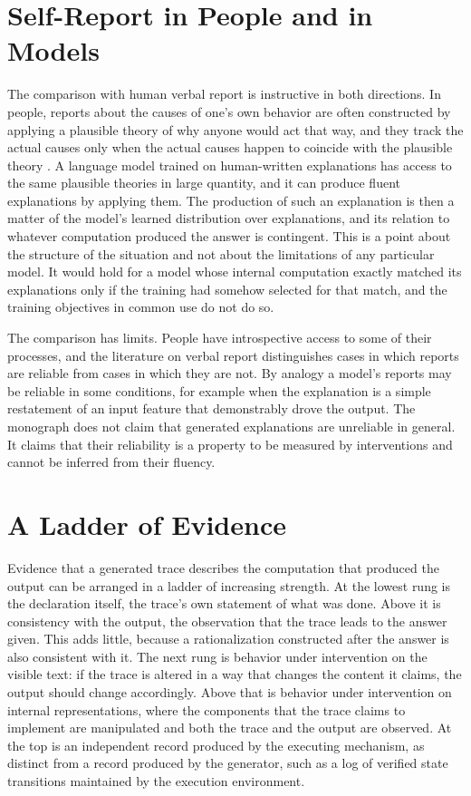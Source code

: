 \section{Self-Report in People and in Models}

The comparison with human verbal report is instructive in both directions. In people, reports about the causes of one's own behavior are often constructed by applying a plausible theory of why anyone would act that way, and they track the actual causes only when the actual causes happen to coincide with the plausible theory \cite{nisbett1977}. A language model trained on human-written explanations has access to the same plausible theories in large quantity, and it can produce fluent explanations by applying them. The production of such an explanation is then a matter of the model's learned distribution over explanations, and its relation to whatever computation produced the answer is contingent. This is a point about the structure of the situation and not about the limitations of any particular model. It would hold for a model whose internal computation exactly matched its explanations only if the training had somehow selected for that match, and the training objectives in common use do not do so.

The comparison has limits. People have introspective access to some of their processes, and the literature on verbal report distinguishes cases in which reports are reliable from cases in which they are not. By analogy a model's reports may be reliable in some conditions, for example when the explanation is a simple restatement of an input feature that demonstrably drove the output. The monograph does not claim that generated explanations are unreliable in general. It claims that their reliability is a property to be measured by interventions and cannot be inferred from their fluency.

\section{A Ladder of Evidence}

Evidence that a generated trace describes the computation that produced the output can be arranged in a ladder of increasing strength. At the lowest rung is the declaration itself, the trace's own statement of what was done. Above it is consistency with the output, the observation that the trace leads to the answer given. This adds little, because a rationalization constructed after the answer is also consistent with it. The next rung is behavior under intervention on the visible text: if the trace is altered in a way that changes the content it claims, the output should change accordingly. Above that is behavior under intervention on internal representations, where the components that the trace claims to implement are manipulated and both the trace and the output are observed. At the top is an independent record produced by the executing mechanism, as distinct from a record produced by the generator, such as a log of verified state transitions maintained by the execution environment.

